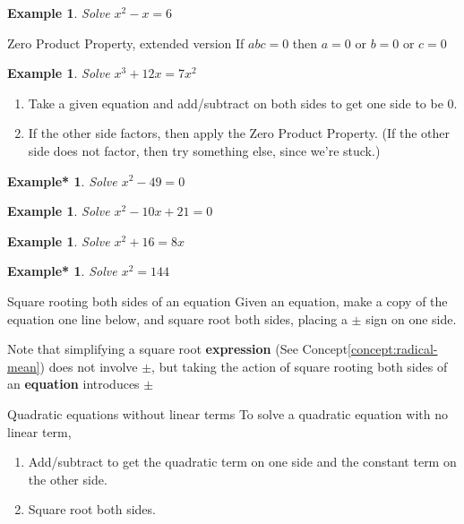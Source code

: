 \documentclass[twoside]{tufte-handout}
\newcounter{ekcounter}%
\theoremstyle{ekimcustom}
\newtheorem{exm}[ekcounter]{Example}
\newtheorem{exmref}[ekcounter]{Example*}
\begin{document}

\begin{exm}
Solve $x^2-x=6$
\end{exm}
\vskip10pt
\begin{bmethod}{Zero Product Property, extended version}{}
If $abc=0$ then $a=0$ or $b=0$ or $c=0$
\end{bmethod}
\begin{exm}
Solve $x^3+12x=7x^2$
\end{exm}
\vskip10pt


\begin{bmethod}{}{}
\begin{enumerate}
\item
Take a given equation and add/subtract on both sides to get one side to be $0$.
\item If the other side factors, then apply the Zero Product Property. (If the other side does not factor, then try something else, since we're stuck.)
\end{enumerate}
\end{bmethod}

\begin{exmref}\label{x249}
Solve $x^2-49=0$
\end{exmref}
\vskip10pt
\begin{exm}
Solve $x^2-10x+21=0$
\end{exm}
\vskip10pt
\begin{exm}
Solve $x^2+16=8x$
\end{exm}
\vskip10pt
\begin{exmref}\label{x2144}
Solve $x^2=144$
\end{exmref}
\vskip10pt


\begin{bmethod}{Square rooting both sides of an equation}{}
Given an equation, make a copy of the equation one line below, and square root both sides, placing a $\pm$ sign on one side.
\end{bmethod}
Note that simplifying a square root {\bf expression} (See Concept\ref{concept:radical-mean}) does not involve $\pm$, but taking the action of square rooting both sides of an {\bf equation} introduces $\pm$

\begin{bmethod}{Quadratic equations without linear terms}{}
To solve a quadratic equation with no linear term,
\begin{enumerate}
\item Add/subtract to get the quadratic term on one side and the constant term on the other side.
\item Square root both sides.
\end{enumerate}
\end{bmethod}
\end{document}
